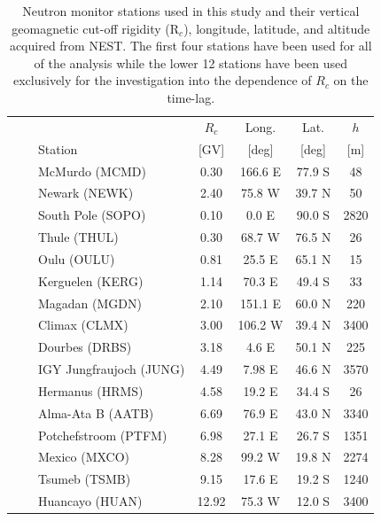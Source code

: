 \begin{table}
	\begin{center}

	\caption{Neutron monitor stations used in this study and their vertical geomagnetic cut-off rigidity (R$_c$), longitude, latitude, and altitude acquired from NEST. The first four stations have been used for all of the analysis while the lower 12 stations have been used exclusively for the investigation into the dependence of $R_c$ on the time-lag.}
	\label{tab:NM_stns}
	
	\begin{tabular}{l l l c c c c}
		\hline
		& &  & $R_c$  & Long. & Lat.  & $h$  \\
		& & Station & [GV] & [deg] & [deg] & [m]  \\
		\hline
		\parbox[t]{2mm}{} &
		\parbox[t]{2mm}{}
		& McMurdo (MCMD) & 0.30 & 166.6 E & 77.9 S & 48 \\
		& & Newark (NEWK) & 2.40 & 75.8 W & 39.7 N & 50  \\
		& & South Pole (SOPO) & 0.10 & 0.0 E & 90.0 S & 2820\\
		& & Thule (THUL) & 0.30 & 68.7 W & 76.5 N & 26 \\
		\hline
		\parbox[t]{2mm}{} &
		\parbox[t]{2mm}{}
		& Oulu (OULU) & 0.81 & 25.5 E & 65.1 N & 15 \\
		& & Kerguelen (KERG) & 1.14 & 70.3 E & 49.4 S & 33 \\
		& & Magadan (MGDN) & 2.10 & 151.1 E & 60.0 N & 220 \\
		& & Climax (CLMX) & 3.00 & 106.2 W & 39.4 N & 3400  \\
		& & Dourbes (DRBS) & 3.18 & 4.6 E & 50.1 N & 225 \\
		& & IGY Jungfraujoch (JUNG) & 4.49 & 7.98 E & 46.6 N & 3570 \\
		& & Hermanus (HRMS) & 4.58 & 19.2 E & 34.4 S & 26 \\
		& & Alma-Ata B (AATB) & 6.69 & 76.9 E & 43.0 N &  3340 \\
		& & Potchefstroom (PTFM) & 6.98 &  27.1 E &  26.7 S &  1351 \\
		& & Mexico (MXCO) & 8.28 & 99.2 W & 19.8 N & 2274 \\
		& & Tsumeb (TSMB) & 9.15 & 17.6 E & 19.2 S &  1240 \\
		& & Huancayo (HUAN) & 12.92 &  75.3 W &  12.0 S &  3400 \\
		\hline
		
	\end{tabular}
	\end{center}
\end{table}



